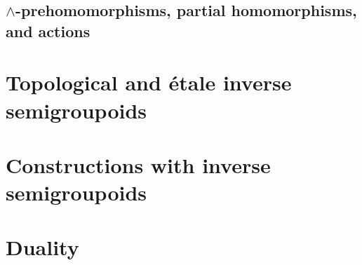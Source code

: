 \documentclass[a4paper]{amsart}
\theoremstyle{plain}    \newtheorem{theorem}[generalnumbering]{Theorem}
\theoremstyle{plain}    \newtheorem{corollary}[generalnumbering]{Corollary}
\theoremstyle{definition}   \newtheorem{definition}[generalnumbering]{Definition}
\theoremstyle{definition}   \newtheorem{example}[generalnumbering]{Example}
\theoremstyle{plain}    \newtheorem{proposition}[generalnumbering]{Proposition}
\theoremstyle{plain}    \newtheorem{lemma}[generalnumbering]{Lemma}
\theoremstyle{plain}    \newtheorem{plainstyle}[generalnumbering]{\namefordifferentenvironment}
\theoremstyle{plain}    \newtheorem*{plainstyle*}{\namefordifferentenvironment}
\theoremstyle{definition}    \newtheorem{definitionstyle}[generalnumbering]{\namefordifferentenvironment}
\theoremstyle{definition}    \newtheorem*{definitionstyle*}{\namefordifferentenvironment}
\begin{document}
    \subsection{\texorpdfstring{$\land$}{∧}-prehomomorphisms, partial homomorphisms, and actions}\label{sec:dualprehomomorphisms}
    
    
    
\section{Topological and étale inverse semigroupoids}
    

\section{Constructions with inverse semigroupoids}\label{sec:categoricalconstructions}
    

\section{Duality}\label{sec:duality}
    



\end{document}

